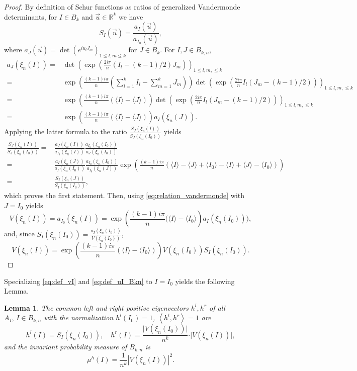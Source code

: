 \documentclass[10pt,11pt]{amsart}%
\newtheorem{lemma}[theorem]{Lemma}
\begin{document}
\begin{proof}
By definition of Schur functions as ratios of generalized Vandermonde determinants, for $I\in B_{k}$ and $\vec{u}\in \mathbb{R}^k$ we have
$$S_{I}(\vec{u})=\frac{a_{I}(\vec{u})}{a_{I_0}(\vec{u})},$$
where $a_{J}(\vec{u})=\det\left(e^{iu_lJ_m}\right)_{1\leq l,m\leq k}$ for $J\in B_{k}$. For $I,J\in B_{k,n}$,
\begin{align}
a_{J}(\xi_{n}(I))=&\det\left(\exp\left(\frac{2i\pi}{n}(I_l-(k-1)/2)J_m\right)\right)_{1\leq l,m,\leq k}\nonumber\\
=&\exp\left(\frac{(k-1)i\pi}{n}\left(\sum_{l=1}^kI_l-\sum_{m=1}^kJ_m\right)\right)\det\left(\exp\left(\frac{2i\pi}{n}I_l(J_m-(k-1)/2)\right)\right)_{1\leq l,m,\leq k}\nonumber\\
=&\exp\left(\frac{(k-1)i\pi}{n}(\langle I\rangle-\langle J\rangle)\right)\det\left(\exp\left(\frac{2i\pi}{n}I_l(J_m-(k-1)/2)\right)\right)_{1\leq l,m,\leq k}\nonumber\\
=&\exp\left(\frac{(k-1)i\pi}{n}(\langle I\rangle-\langle J\rangle)\right)a_{I}(\xi_{n}(J)).\label{eq:relation_vandermonde}
\end{align}
Applying the latter formula to the ratio $\frac{S_J(\xi_{n}(I))}{S_J(\xi_{n}(I_0))}$ yields
\begin{align*}
\frac{S_J(\xi_{n}(I))}{S_J(\xi_{n}(I_0))}=&\frac{a_{J}(\xi_{n}(I))}{a_{I_0}(\xi_{n}(I))}\frac{a_{I_0}(\xi_{n}(I_0))}{a_{J}(\xi_{n}(I_0))}\\
=&\frac{a_{I}(\xi_{n}(J))}{a_{I}(\xi_{n}(I_0))}\frac{a_{I_0}(\xi_{n}(I_0))}{a_{I_0}(\xi_{n}(J))}\exp\left(\frac{(k-1)i\pi}{n}\left(\langle I\rangle-\langle J\rangle+\langle I_0\rangle-\langle I\rangle+\langle J\rangle-\langle I_0\rangle\right)\right)\\
=&\frac{S_I(\xi_{n}(J))}{S_I(\xi_{n}(I_0))},
\end{align*}
which proves the first statement. Then, using \eqref{eq:relation_vandermonde} with $J=I_0$ yields
$$V(\xi_{n}(I))=a_{I_0}(\xi_{n}(I))=\exp\left(\frac{(k-1)i\pi}{n}(\langle I\rangle-\langle I_0\rangle\right)a_{I}(\xi_{n}(I_0))),$$
and, since $S_I(\xi_{n}(I_0))=\frac{a_{I}(\xi_{n}(I_0))}{V(\xi_{n}(I_0))}$,
$$V(\xi_{n}(I))=\exp\left(\frac{(k-1)i\pi}{n}(\langle I\rangle-\langle I_0\rangle)\right)V(\xi_{n}(I_0))S_I(\xi_{n}(I_0)).$$
\end{proof} 
Specializing \eqref{eq:def_vI} and \eqref{eq:def_uI_Bkn} to $I=I_0$ yields the following Lemma.
\begin{lemma}\label{lem:Perron-Frobenius}
The common left and right positive eigenvectors $h^l, h^r$ of all $A_{I},\, I\in B_{k,n}$ with the normalization $h^l(I_0)=1$, $\left\langle h^l,h^r\right\rangle=1$ are 
$$h^l(I)=S_I(\xi_{n}(I_0)),\quad h^r(I)=\frac{\vert V(\xi_{n}(I_0))\vert}{n^k}\cdot\vert V(\xi_{n}(I))\vert,$$
and the invariant probability measure of $B_{k,n}$ is 
$$\mu^h(I)=\frac{1}{n^k}\left\vert V(\xi_{n}(I))\right\vert^2.$$
\end{lemma}
\end{document}
